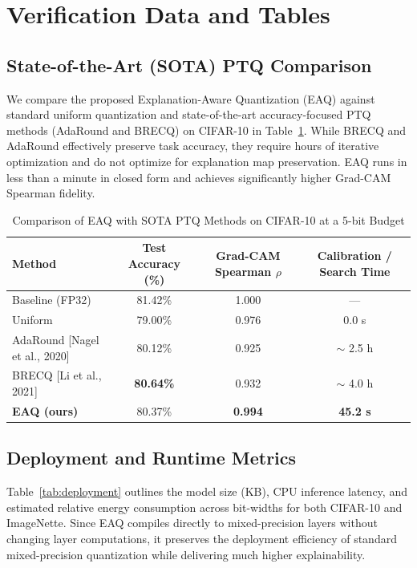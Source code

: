 \documentclass[11pt,a4paper]{article}
\begin{document}
\newpage
\section{Verification Data and Tables}

\subsection{State-of-the-Art (SOTA) PTQ Comparison}
We compare the proposed Explanation-Aware Quantization (EAQ) against standard uniform quantization and state-of-the-art accuracy-focused PTQ methods (AdaRound and BRECQ) on CIFAR-10 in Table~\ref{tab:sotacomp}. While BRECQ and AdaRound effectively preserve task accuracy, they require hours of iterative optimization and do not optimize for explanation map preservation. EAQ runs in less than a minute in closed form and achieves significantly higher Grad-CAM Spearman fidelity.

\begin{table}[h]
\caption{Comparison of EAQ with SOTA PTQ Methods on CIFAR-10 at a 5-bit Budget}
\label{tab:sotacomp}
\centering
\begin{tabular}{lccc}
\toprule
\textbf{Method} & \textbf{Test Accuracy (\%)} & \textbf{Grad-CAM Spearman $\rho$} & \textbf{Calibration / Search Time} \\
\midrule
Baseline (FP32) & 81.42\% & 1.000 & --- \\
Uniform & 79.00\% & 0.976 & 0.0 s \\
AdaRound [Nagel et al., 2020] & 80.12\% & 0.925 & $\sim$ 2.5 h \\
BRECQ [Li et al., 2021] & \textbf{80.64\%} & 0.932 & $\sim$ 4.0 h \\
\textbf{EAQ (ours)} & 80.37\% & \textbf{0.994} & \textbf{45.2 s} \\
\bottomrule
\end{tabular}
\end{table}

\subsection{Deployment and Runtime Metrics}
Table~\ref{tab:deployment} outlines the model size (KB), CPU inference latency, and estimated relative energy consumption across bit-widths for both CIFAR-10 and ImageNette. Since EAQ compiles directly to mixed-precision layers without changing layer computations, it preserves the deployment efficiency of standard mixed-precision quantization while delivering much higher explainability.
\end{document}
